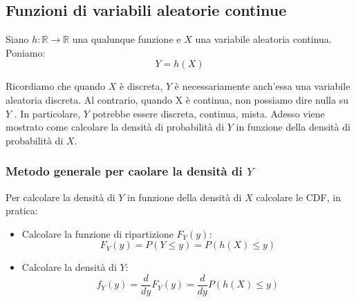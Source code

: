 
\subsection{Funzioni di variabili aleatorie continue}
Siano $h: \mathbb{R} \to \mathbb{R}$ una qualunque funzione e $X$ una variabile aleatoria continua. Poniamo:
\[
  Y = h(X)
\]

Ricordiamo che quando $X$ è discreta, $Y$ è necessariamente anch’essa una variabile aleatoria discreta. Al contrario, quando X è continua, non possiamo dire nulla su $Y$ . In particolare, $Y$ potrebbe essere discreta, continua, mista. Adesso viene mostrato come calcolare la densità di probabilità di $Y$ in funzione della densità di probabilità di $X$.

\subsubsection{Metodo generale per caolare la densità di $Y$}

Per calcolare la densità di $Y$ in funzione della densità di $X$ calcolare le CDF, in pratica:
\begin{itemize}
  \item Calcolare la funzione di ripartizione $F_Y(y)$:
  \[
    F_Y (y) = P(Y \leq y) = P(h(X) \leq y) 
  \]
  \item Calcolare la densità di $Y$:
  \[
    f_Y(y) = \frac{d}{dy}F_Y(y) = \frac{d}{dy}P(h(X) \leq y)
  \]
\end{itemize}

